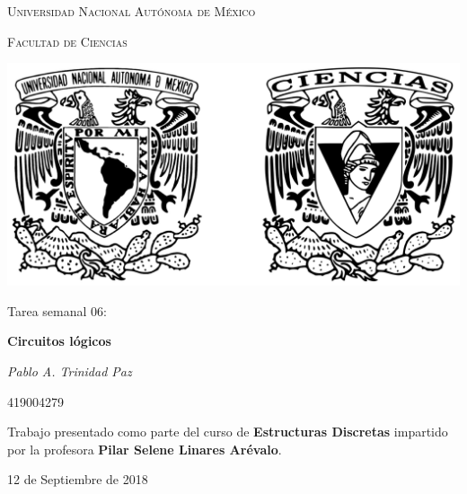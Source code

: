 \documentclass[11pt,letterpaper]{article}
\begin{document}
\begin{titlepage}
    \centering

    {\scshape\LARGE Universidad Nacional Autónoma de México \par}

    \vspace{1cm}
    {\scshape\Large Facultad de Ciencias\par}
    \vspace{1.5cm}

    \begin{center}
        \includegraphics[scale=.1]{../../assets/img/logo.png}
    \end{center}

    \vspace{.8 cm}

    {\LARGE Tarea semanal 06: \par}
    {\huge\bfseries Circuitos lógicos \par}

    \vspace{0.5cm}
    {\large\itshape Pablo A. Trinidad Paz\par}
    419004279

    \vfill

    Trabajo presentado como parte del curso de \textbf{Estructuras Discretas}
    impartido por la profesora \textbf{Pilar Selene Linares Arévalo}. \par
    \vspace{0.1cm}
    {\large 12 de Septiembre de 2018\par}
\end{titlepage}
\end{document}
